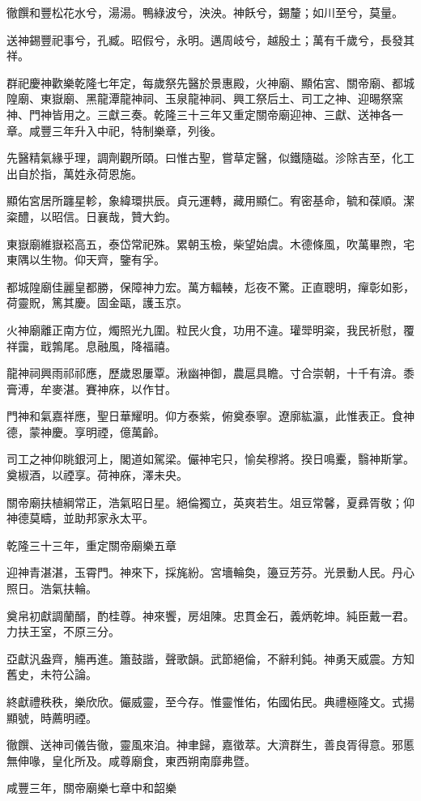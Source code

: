 \begin{pinyinscope}
徹饌和豐松花水兮，湯湯。鴨綠波兮，泱泱。神飫兮，錫釐；如川至兮，莫量。

送神錫豐祀事兮，孔臧。昭假兮，永明。邁周岐兮，越殷土；萬有千歲兮，長發其祥。

群祀慶神歡樂乾隆七年定，每歲祭先醫於景惠殿，火神廟、顯佑宮、關帝廟、都城隍廟、東嶽廟、黑龍潭龍神祠、玉泉龍神祠、興工祭后土、司工之神、迎晹祭窯神、門神皆用之。三獻三奏。乾隆三十三年又重定關帝廟迎神、三獻、送神各一章。咸豐三年升入中祀，特制樂章，列後。

先醫精氣緣乎理，調劑觀所頤。曰惟古聖，嘗草定醫，似鐵隨磁。沴除吉至，化工出自於指，萬姓永荷恩施。

顯佑宮居所躔星軫，象緯環拱辰。貞元運轉，藏用顯仁。宥密基命，毓和葆順。潔粢醴，以昭信。日襄哉，贊大鈞。

東嶽廟維嶽崧高五，泰岱常祀殊。累朝玉檢，柴望始虞。木德條風，吹萬畢煦，宅東隅以生物。仰天齊，鑒有孚。

都城隍廟佳麗皇都勝，保障神力宏。萬方輻輳，尨夜不驚。正直聰明，癉彰如影，荷靈貺，篤其慶。固金甌，護玉京。

火神廟離正南方位，燭照光九圍。粒民火食，功用不違。瓘斝明粢，我民祈慰，覆祥靄，戢鶉尾。息融風，降福禧。

龍神祠興雨祁祁應，歷歲恩屢覃。湫幽神御，農扈具瞻。寸合崇朝，十千有渰。黍膏溥，牟麥湛。賽神庥，以作甘。

門神和氣嘉祥應，聖日華耀明。仰方泰紫，俯奠泰寧。遼廓紘瀛，此惟表正。食神德，蒙神慶。享明禋，億萬齡。

司工之神仰眺銀河上，閣道如駕梁。儼神宅只，愉矣穆將。揆日鳴櫜，翳神斯掌。奠椒酒，以禋享。荷神庥，澤未央。

關帝廟扶植綱常正，浩氣昭日星。絕倫獨立，英爽若生。俎豆常馨，夏彞胥敬；仰神德莫疇，並助邦家永太平。

乾隆三十三年，重定關帝廟樂五章

迎神青湛湛，玉霄門。神來下，採旄紛。宮墻輪奐，籩豆芳芬。光景動人民。丹心照日。浩氣扶輪。

奠帛初獻調蘭醑，酌桂尊。神來饗，房俎陳。忠貫金石，義炳乾坤。純臣戴一君。力扶王室，不原三分。

亞獻汎盎齊，觴再進。簫鼓諧，聲歌韻。武節絕倫，不辭利鈍。神勇天威震。方知舊史，未符公論。

終獻禮秩秩，樂欣欣。儼威靈，至今存。惟靈惟佑，佑國佑民。典禮極隆文。式揚顯號，時薦明禋。

徹饌、送神司儀告徹，靈風來洎。神聿歸，嘉徵萃。大濟群生，善良胥得意。邪慝無伸喙，皇化所及。咸尊廟食，東西朔南靡弗暨。

咸豐三年，關帝廟樂七章中和韶樂


\end{pinyinscope}
